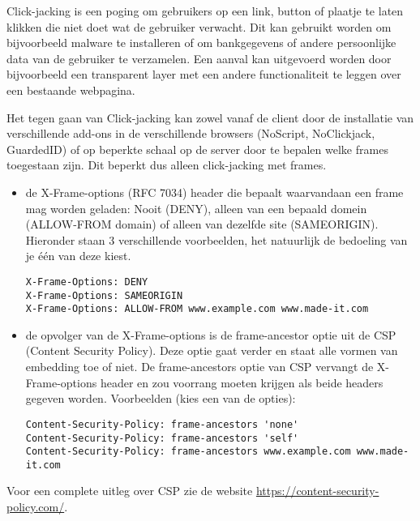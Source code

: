 Click-jacking is een poging om gebruikers op een link, button of plaatje te laten klikken die niet doet wat de gebruiker verwacht. Dit kan gebruikt worden om bijvoorbeeld malware te installeren of om bankgegevens of andere persoonlijke data van de gebruiker te verzamelen. Een aanval kan uitgevoerd worden door bijvoorbeeld een transparent layer met een andere functionaliteit te leggen over een bestaande webpagina.

Het tegen gaan van Click-jacking kan zowel vanaf de client door de installatie van verschillende add-ons in de verschillende browsers (NoScript, NoClickjack, GuardedID) of op beperkte schaal op de server door te bepalen welke frames toegestaan zijn. Dit beperkt dus alleen click-jacking met frames.

\begin{itemize}
	\item de X-Frame-options (RFC 7034) header die bepaalt waarvandaan een frame mag worden geladen: Nooit (DENY), alleen van een bepaald domein (ALLOW-FROM domain) of alleen van dezelfde site (SAMEORIGIN). Hieronder staan 3 verschillende voorbeelden, het natuurlijk de bedoeling van je \'e\'en van deze kiest.
\begin{lstlisting}
X-Frame-Options: DENY
X-Frame-Options: SAMEORIGIN
X-Frame-Options: ALLOW-FROM www.example.com www.made-it.com
\end{lstlisting}
\item de opvolger van de X-Frame-options is de frame-ancestor optie uit de CSP (Content Security Policy). Deze optie gaat verder en staat alle vormen van embedding toe of niet. De frame-ancestors optie van CSP vervangt de X-Frame-options header en zou voorrang moeten krijgen als beide headers gegeven worden. Voorbeelden (kies een van de opties):
\begin{lstlisting}
Content-Security-Policy: frame-ancestors 'none'
Content-Security-Policy: frame-ancestors 'self'
Content-Security-Policy: frame-ancestors www.example.com www.made-it.com
\end{lstlisting}
\end{itemize}

Voor een complete uitleg over CSP zie de website \url{https://content-security-policy.com/}.
